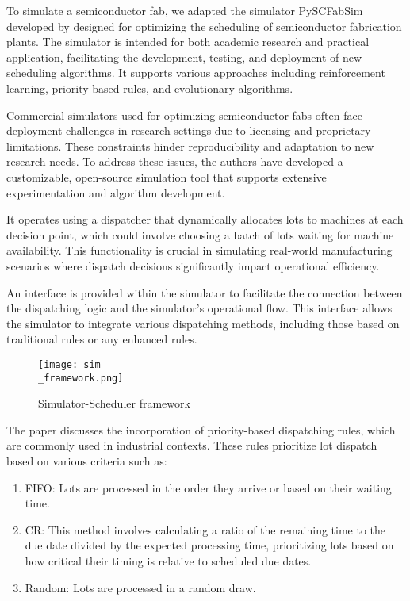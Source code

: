 To simulate a semiconductor fab, we adapted the simulator PySCFabSim developed by \cite{Kovacs2022} designed for optimizing the scheduling of semiconductor fabrication plants. The simulator is intended for both academic research and practical application, facilitating the development, testing, and deployment of new scheduling algorithms. It supports various approaches including reinforcement learning, priority-based rules, and evolutionary algorithms.

Commercial simulators used for optimizing semiconductor fabs often face deployment challenges in research settings due to licensing and proprietary limitations. These constraints hinder reproducibility and adaptation to new research needs. To address these issues, the authors have developed a customizable, open-source simulation tool that supports extensive experimentation and algorithm development.

It operates using a dispatcher that dynamically allocates lots to machines at each decision point, which could involve choosing a batch of lots waiting for machine availability. This functionality is crucial in simulating real-world manufacturing scenarios where dispatch decisions significantly impact operational efficiency.

An interface is provided within the simulator to facilitate the connection between the dispatching logic and the simulator's operational flow. This interface allows the simulator to integrate various dispatching methods, including those based on traditional rules or any enhanced rules.

\begin{figure}[t]
	\texttt{[image: sim\\\_framework.png]}
	\caption{Simulator-Scheduler framework}
	\label{fig:ss}
\end{figure}

The paper discusses the incorporation of priority-based dispatching rules, which are commonly used in industrial contexts. These rules prioritize lot dispatch based on various criteria such as:

\begin{enumerate}
	\item FIFO: Lots are processed in the order they arrive or based on their waiting time.
	\item CR: This method involves calculating a ratio of the remaining time to the due date divided by the expected processing time, prioritizing lots based on how critical their timing is relative to scheduled due dates.
	\item Random: Lots are processed in a random draw. 
\end{enumerate}

